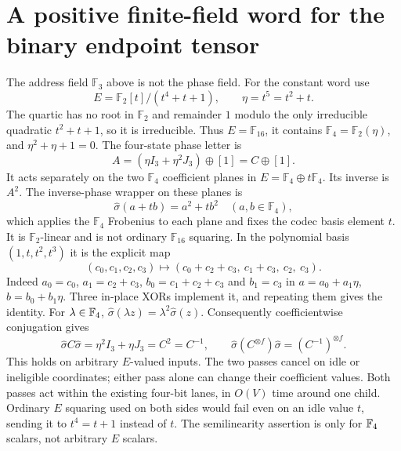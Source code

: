 \section{A positive finite-field word for the binary endpoint tensor}
\label{app:positive-word}

The address field $\mathbb F_3$ above is not the phase field. For the
constant word use
\[
 E=\mathbb F_2[t]/(t^4+t+1),\qquad \eta=t^5=t^2+t.
\]
The quartic has no root in $\mathbb F_2$ and remainder $1$ modulo the
only irreducible quadratic $t^2+t+1$, so it is irreducible. Thus
$E=\mathbb F_{16}$, it contains $\mathbb F_4=\mathbb F_2(\eta)$, and
$\eta^2+\eta+1=0$. The four-state phase letter is
\[
 A=(\eta I_3+\eta^2J_3)\oplus[1]=C\oplus[1].
\]
It acts separately on the two $\mathbb F_4$ coefficient planes in
$E=\mathbb F_4\oplus t\mathbb F_4$. Its inverse is $A^2$.
The inverse-phase wrapper on these planes is
\begin{equation}
 \widehat\sigma(a+tb)=a^2+t b^2\quad(a,b\in\mathbb F_4),       \label{eq:positive-17}
\end{equation}
which applies the $\mathbb F_4$ Frobenius to each plane and fixes the
codec basis element $t$. It is $\mathbb F_2$-linear and is not ordinary
$\mathbb F_{16}$ squaring.
In the polynomial basis $(1,t,t^2,t^3)$ it is the explicit map
\[
 (c_0,c_1,c_2,c_3)\longmapsto
 (c_0+c_2+c_3,\ c_1+c_3,\ c_2,\ c_3).
\]
Indeed $a_0=c_0$, $a_1=c_2+c_3$, $b_0=c_1+c_2+c_3$ and
$b_1=c_3$ in $a=a_0+a_1\eta$, $b=b_0+b_1\eta$.
Three in-place XORs implement it, and repeating them gives the identity.
For $\lambda\in\mathbb F_4$,
$\widehat\sigma(\lambda z)=\lambda^2\widehat\sigma(z)$.
Consequently coefficientwise conjugation gives
\[
 \widehat\sigma C\widehat\sigma
   =\eta^2I_3+\eta J_3=C^2=C^{-1},
 \qquad
 \widehat\sigma(C^{\otimes f})\widehat\sigma
   =(C^{-1})^{\otimes f}.
\]
This holds on arbitrary $E$-valued inputs. The two passes cancel on
idle or ineligible coordinates; either pass alone can change their
coefficient values. Both passes act within the existing four-bit lanes,
in $O(V)$ time around one child. Ordinary $E$ squaring used on both
sides would fail even on an idle value $t$, sending it to
$t^4=t+1$ instead of $t$. The semilinearity assertion is only for
$\mathbb F_4$ scalars, not arbitrary $E$ scalars.

